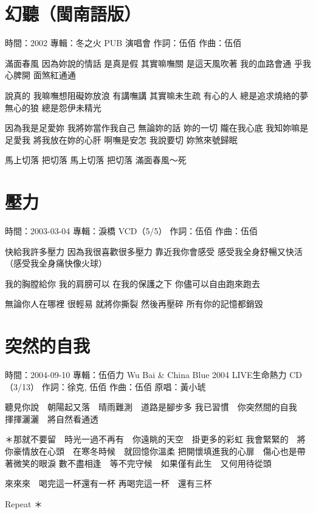 \documentclass[UTF8,a4paper,oneside,twocolumn,12pt]{ctexbook}
\newcommand{\infopair}[2]{\textbullet #1：#2}
\newcommand{\zc}[1][伍佰]{\infopair{作詞}{#1}}
\newcommand{\zq}[1][伍佰]{\infopair{作曲}{#1}}
\newcommand{\zj}[1]{\infopair{專輯}{#1}}
\newcommand{\yc}[1]{\infopair{原唱}{#1}}
\newcommand{\sj}[1]{\infopair{時間}{#1}}
\newenvironment{info}{\begin{flushleft}\kaishu
	}
	{\end{flushleft}\normalsize\yahei\par}
\newenvironment{lyric}{
	}
{}
\begin{document}
\section{幻聽（閩南語版）}
\begin{info}
	\sj{2002}
	\zj{冬之火 PUB 演唱會}
	\zc
	\zq
\end{info}
\begin{lyric}
	滿面春風 因為妳說的情話 是真是假 其實嘛嘸關
	是這天風吹著 我的血路會通 乎我心脾開 面煞紅通通

	說真的 我嘛嘸想阻礙妳放浪 有講嘸講 其實嘛未生疏
	有心的人 總是追求燒絡的夢 無心的狼 總是怨伊未精光

	因為我是足愛妳 我將妳當作我自己 無論妳的話 妳的一切 隴在我心底
	我知妳嘛是足愛我 將我放在妳的心肝 啊嘸是安怎 我說要切 妳煞來號歸眠

	馬上切落 把切落 馬上切落 把切落 滿面春風～死
\end{lyric}

\section{壓力}
\begin{info}
	\sj{2003-03-04}
	\zj{淚橋 VCD（5/5）}
	\zc
	\zq
\end{info}
\begin{lyric}
	快給我許多壓力
	因為我很喜歡很多壓力
	靠近我你會感受
	感受我全身舒暢又快活（感受我全身痛快像火球）

	我的胸膛給你
	我的肩膀可以
	在我的保護之下
	你儘可以自由跑來跑去

	無論你人在哪裡
	很輕易
	就將你撕裂
	然後再壓碎
	所有你的記憶都銷毀
\end{lyric}

\section{突然的自我}
\begin{info}
	\sj{2004-09-10}
	\zj{伍佰力 Wu Bai \& China Blue 2004 LIVE生命熱力 CD（3/13）}
	\zc[徐克, 伍佰]
	\zq
	\yc{黃小琥}
\end{info}
\begin{lyric}
	聽見你說　朝陽起又落　晴雨難測　道路是腳步多
	我已習慣　你突然間的自我　揮揮灑灑　將自然看通透

	＊那就不要留　時光一過不再有　你遠眺的天空　掛更多的彩虹
	我會緊緊的　將你豪情放在心頭　在寒冬時候　就回憶你溫柔
	把開懷填進我的心扉　傷心也是帶著微笑的眼淚
	數不盡相逢　等不完守候　如果僅有此生　又何用待從頭

	來來來　喝完這一杯還有一杯
	再喝完這一杯　還有三杯

	Repeat ＊
\end{lyric}
\end{document}
